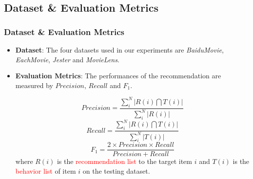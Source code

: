 \documentclass{beamer}
\newcommand{\red}[1]{\textcolor{red}{#1}}%
\begin{document}
\subsection{Dataset \& Evaluation Metrics}
\begin{frame}
\frametitle{Dataset \& Evaluation Metrics}
\begin{itemize}
\item<2-> \textbf{Dataset}: The four datasets used in our experiments are \emph{BaiduMovie}, \emph{EachMovie}, \emph{Jester} and \emph{MovieLens}.
\vskip 0.2in
\item<3-> \textbf{Evaluation Metrics}: The performances of the recommendation are measured by $Precision$, $Recall$ and $F_1$.

\begin{equation}\label{eq:precision}
  Precision = \frac{\sum_i^N |R(i) \bigcap T(i)|}{\sum_i^N |R(i)|}
\end{equation}
\begin{equation}\label{eq:recall}
  Recall = \frac{\sum_i^N |R(i) \bigcap T(i)|}{\sum_i^N |T(i)|}
\end{equation}
\begin{equation}\label{eq:F_1}
  F_1 = \frac{2 \times Precision \times Recall}{Precision + Recall}
\end{equation}
where $R(i)$ is the \red{recommendation list} to the target item $i$ %
and $T(i)$ is the \red{behavior list} of item $i$ on the testing dataset.

\end{itemize}
\end{frame}
\end{document}
